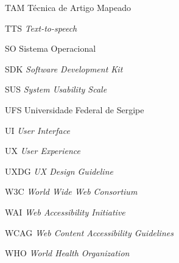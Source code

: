 \begin{siglas}
	\item[TAM]{Técnica de Artigo Mapeado}
	\item[TTS]{\textit{Text-to-speech}}
	\item[SO]{Sistema Operacional}
	\item[SDK]{\textit{Software Development Kit}}
	\item[SUS]{\textit{System Usability Scale}}
	\item[UFS]{Universidade Federal de Sergipe}
	\item[UI]{\textit{User Interface}}
	\item[UX]{\textit{User Experience}}
	\item[UXDG]{\textit{UX Design Guideline}}
	\item[W3C]{\textit{World Wide Web Consortium}}
	\item[WAI]{\textit{Web Accessibility Initiative}}
	\item[WCAG]{\textit{Web Content Accessibility Guidelines}}
	\item[WHO]{\textit{World Health Organization}}
\end{siglas}